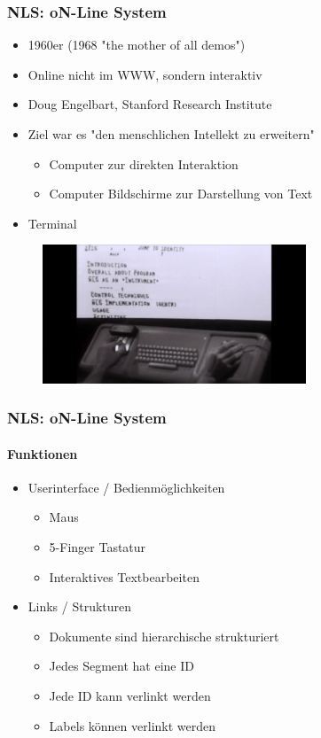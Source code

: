 \begin{frame}
\frametitle{NLS: oN-Line System}
\begin{itemize}
	\item 1960er (1968 "the mother of all demos")
	\item Online nicht im WWW, sondern interaktiv
	\item Doug Engelbart, Stanford Research Institute
	\item Ziel war es "den menschlichen Intellekt zu erweitern"
	\begin{itemize}
		\item Computer zur direkten Interaktion
		\item Computer Bildschirme zur Darstellung von Text
	\end{itemize}
	\item Terminal
\end{itemize}

\begin{figure}[htbp]
	\centering
	\includegraphics[width=0.7\textwidth]{images/nls}
\end{figure}

\end{frame}

\begin{frame}
\frametitle{NLS: oN-Line System}
\framesubtitle{Funktionen}
	\begin{itemize}
		\item Userinterface / Bedienmöglichkeiten
		\begin{itemize}
			\item Maus
			\item 5-Finger Tastatur
			\item Interaktives Textbearbeiten
		\end{itemize}
		\item Links / Strukturen
		\begin{itemize}
			\item Dokumente sind hierarchische strukturiert
			\item Jedes Segment hat eine ID
			\item Jede ID kann verlinkt werden
			\item Labels können verlinkt werden
		\end{itemize}
	\end{itemize}
\end{frame}
